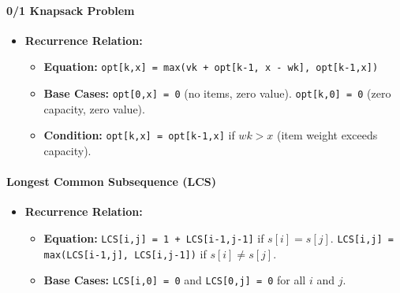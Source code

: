 \documentclass[landscape,7pt]{extarticle}
\begin{document}
\begin{multicols*}{3}
\paragraph{0/1 Knapsack Problem}
\begin{itemize}
\item \textbf{Recurrence Relation:}
\begin{itemize}
\item \textbf{Equation:} \texttt{opt[k,x] = max(vk + opt[k-1, x - wk], opt[k-1,x])}
\item \textbf{Base Cases:} \texttt{opt[0,x] = 0} (no items, zero value). \texttt{opt[k,0] = 0} (zero capacity, zero value).
\item \textbf{Condition:} \texttt{opt[k,x] = opt[k-1,x]} if $wk > x$ (item weight exceeds capacity).
\end{itemize}
\end{itemize}

\paragraph{Longest Common Subsequence (LCS)}
\begin{itemize}
\item \textbf{Recurrence Relation:}
\begin{itemize}
\item \textbf{Equation:} \texttt{LCS[i,j] = 1 + LCS[i-1,j-1]} if $s[i] = s[j]$. \texttt{LCS[i,j] = max(LCS[i-1,j], LCS[i,j-1])} if $s[i] \neq s[j]$.
\item \textbf{Base Cases:} \texttt{LCS[i,0] = 0} and \texttt{LCS[0,j] = 0} for all $i$ and $j$.
\end{itemize}
\end{itemize}


\end{multicols*}
\end{document}
